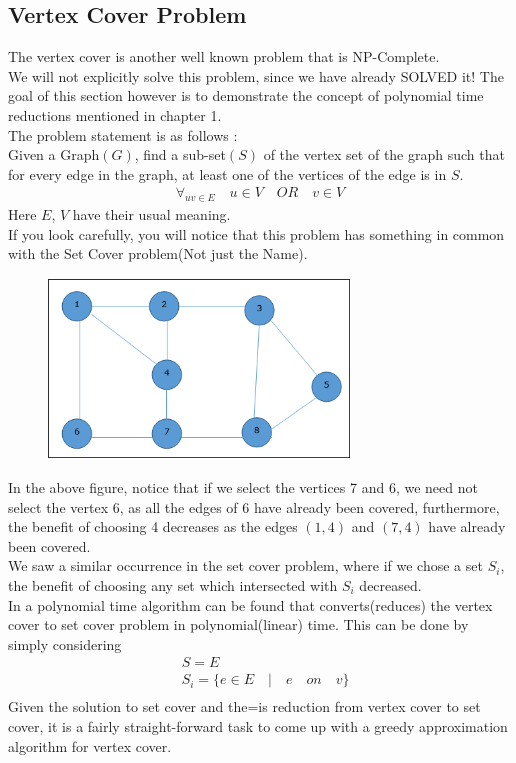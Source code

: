 \documentclass[12pt]{report}
\begin{document}
\subsection*{Vertex Cover Problem}
The vertex cover is another well known problem that is NP-Complete. \\ 
We will not explicitly solve this problem, since we have already SOLVED it! The goal of this section however is to demonstrate the concept of polynomial time reductions mentioned in chapter 1.\\
The problem statement is as follows :\\
Given a Graph$(G)$, find a sub-set$(S)$ of the vertex set of the graph such that for every edge in the graph, at least one of the vertices of the edge is in $S$.
\begin{align*}
\forall_{uv \in E} \quad u \in V \quad OR \quad v \in V
\end{align*}
Here $E$, $V$ have their usual meaning.\\
If you look carefully, you will notice that this problem has something in common with the Set Cover problem(Not just the Name). \\
\begin{figure}[h]
\includegraphics[width=8cm, height=4.8cm]{v_cover.jpg}
\centering
\end{figure}
In the above figure, notice that if we select the vertices 7 and 6, we need not select the vertex 6, as all the edges of 6 have already been covered, furthermore, the benefit of choosing 4 decreases as the edges $(1,4)$ and $(7,4)$ have already been covered.\\
We saw a similar occurrence in the set cover problem, where if we chose a set $S_i$, the benefit of choosing any set which intersected with $S_i$ decreased. \\
In a polynomial time algorithm can be found that converts(reduces) the vertex cover to set cover problem in polynomial(linear) time. This can be done by simply considering 
\begin{align*}
&S = E \\
&S_i = \{e \in E \quad | \quad e \quad on \quad v \}\\
\end{align*}
Given the solution to set cover and the=is reduction from vertex cover to set cover, it is a fairly straight-forward task to come up with a greedy approximation algorithm for vertex cover.\\
\end{document}

